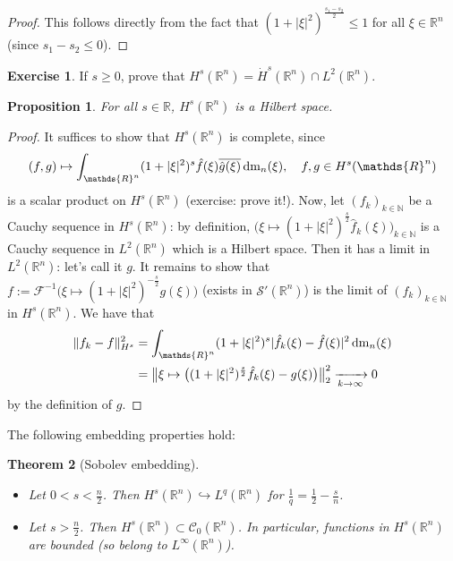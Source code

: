 \documentclass[a4paper, 12pt]{article}
\theoremstyle{plain}
\newtheorem{proposition}{Proposition}[section]
\newtheorem{theorem}[proposition]{Theorem}
\theoremstyle{definition}
\newtheorem{exercise}{Exercise}
\theoremstyle{remark}
\numberwithin{equation}{section}
\begin{document}
\begin{proof}
This follows directly from the fact that $(1+|\xi|^2)^{\frac{s_1-s_2}{2}}\le 1$ for all $\xi \in {\mathds{R}}^n$ (since $s_1-s_2\le 0$).
\end{proof}

\begin{exercise}
If $s\ge 0$, prove that $H^s({\mathds{R}}^n)=\dot H^s({\mathds{R}}^n)\cap L^2({\mathds{R}}^n)$.
\end{exercise}

\begin{proposition}
For all $s\in{\mathds{R}}$, $H^s({\mathds{R}}^n)$ is a Hilbert space.
\end{proposition}

\begin{proof}
It suffices to show that $H^s({\mathds{R}}^n)$ is complete, since
\[
(f,g)\mapsto \int_{{\mathds{R}}^n} (1+|\xi|^2)^s \hat f(\xi)\overline{\hat g(\xi)}\,{\rm dm}_n(\xi), \quad f,g\in H^s({\mathds{R}}^n)
\]
is a scalar product on $H^s({\mathds{R}}^n)$ (exercise: prove it!). Now, let $(f_k)_{k\in{\mathds{N}}}$ be a Cauchy sequence in
$H^s({\mathds{R}}^n)$: by definition, $\bigl(\xi \mapsto (1+|\xi|^2)^{\frac{s}{2}}\hat f_k(\xi)\bigr)_{k\in{\mathds{N}}}$ is a Cauchy 
sequence in $L^2({\mathds{R}}^n)$ which is a Hilbert space. Then it has a limit in $L^2({\mathds{R}}^n)$: let's call it $g$. It remains to 
show that $f:={\mathscr{F}}^{-1}\bigl(\xi\mapsto (1+|\xi|^2)^{-\frac{s}{2}}g(\xi)\bigr)$ (exists in ${\mathscr{S}}'({\mathds{R}}^n)$) 
is the limit of $(f_k)_{k\in{\mathds{N}}}$ in $H^s({\mathds{R}}^n)$. We have that
%
\begin{align*}
\|f_k-f\|_{H^s}^2&=\int_{{\mathds{R}}^n}(1+|\xi|^2)^s|\hat f_k(\xi)-\hat f(\xi)|^2\,{\rm dm}_n(\xi)\\
&= \bigl\|\xi\mapsto \bigl((1+|\xi|^2)^{\frac{s}{2}}\hat f_k(\xi)-g(\xi)\bigr)\bigr\|_2^2\xrightarrow[k\to\infty]{}0
\end{align*}
%
by the definition of $g$.
\end{proof}

The following embedding properties hold:

\begin{theorem}[Sobolev embedding]
\label{thm:sobolev}
\begin{itemize}
\item[$\cdot$]
Let $0<s<\frac{n}{2}$. Then $H^s({\mathds{R}}^n)\hookrightarrow L^q({\mathds{R}}^n)$ for $\tfrac{1}{q}=\tfrac{1}{2}-\tfrac{s}{n}$.
\item[$\cdot$]
Let $s>\frac{n}{2}$. Then $H^s({\mathds{R}}^n)\subset {\mathscr{C}}_0({\mathds{R}}^n)$. In particular, functions in $H^s({\mathds{R}}^n)$
are bounded (so belong to $L^\infty({\mathds{R}}^n)$).
\end{itemize}
\end{theorem}
\end{document}
